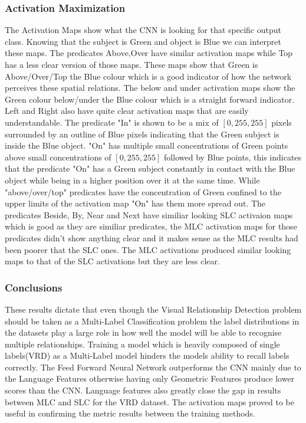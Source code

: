 \documentclass{csfyp}
\begin{document}
\subsubsection{Activation Maximization}
The Activation Maps show what the CNN is looking for that specific output class. Knowing that the subject is Green and object is Blue we can interpret these maps. The \Gls{predicate}s Above,Over have similar activation maps while Top has a less clear version of those maps. These maps show that Green is Above/Over/Top the Blue colour which is a good indicator of how the network perceives these spatial relations. The below and under activation maps show the Green colour below/under the Blue colour which is a straight forward indicator. Left and Right also have quite clear activation maps that are easily understandable. The \Gls{predicate} "In" is shown to be a mix of $[0,255,255]$ pixels surrounded by an outline of Blue pixels indicating that the Green subject is inside the Blue object. "On" has multiple small concentrations  of Green points above small concentrations of $[0,255,255]$ followed by Blue points, this indicates that the \Gls{predicate} "On" has a Green subject constantly in contact with the Blue object while being in a higher position over it at the same time. While "above/over/top" \Gls{predicate}s have the concentration of Green confined to the upper limits of the activation map "On" has them more spread out. The \Gls{predicate}s Beside, By, Near and Next have similiar looking SLC activaion maps which is good as they are similiar \Gls{predicate}s, the MLC activation maps for those \Gls{predicate}s didn't show anything clear and it makes sense as the MLC results had been poorer that the SLC ones. The MLC activations produced similar looking maps to that of the SLC activations but they are less clear.


\subsubsection{Conclusions}
These results dictate that even though the Visual Relationship Detection problem should be taken as a Multi-Label Classification problem the label distributions in the datasets play a large role in how well the model will be able to recognise multiple relationships. Training a model which is heavily composed of single labels(VRD) as a Multi-Label model hinders the models ability to recall labels correctly. The Feed Forward Neural Network outperforms the CNN mainly due to the Language Features otherwise having only Geometric Features produce lower scores than the CNN. Language features also greatly close the gap in results between MLC and SLC for the VRD dataset. The activation maps proved to be useful in confirming the metric results between the training methods.
\end{document}
